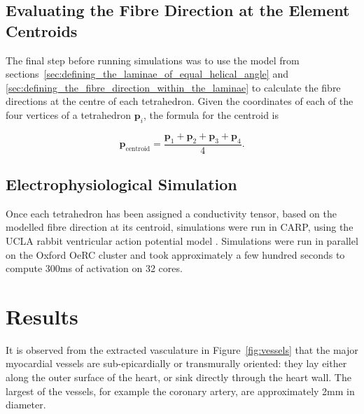 \subsection{Evaluating the Fibre Direction at the Element Centroids} %
\label{sec:evaluating_the_fibre_direction_at_the_element_centroids}
  The final step before running simulations was to use the model from sections~\ref{sec:defining_the_laminae_of_equal_helical_angle} and \ref{sec:defining_the_fibre_direction_within_the_laminae} to calculate the fibre directions at the centre of each tetrahedron. Given the coordinates of each of the four vertices of a tetrahedron $\mathbf{p}_i$, the formula for the centroid is
  
  \begin{equation}
    \mathbf{p}_{\text{centroid}} = \frac{\mathbf{p}_1+\mathbf{p}_2+\mathbf{p}_3+\mathbf{p}_4}{4} .
  \end{equation}
  

\subsection{Electrophysiological Simulation} %
\label{sec:electrophysiological_simulation}  
  Once each tetrahedron has been assigned a conductivity tensor, based on the modelled fibre direction at its centroid, simulations were run in CARP, using the UCLA rabbit ventricular action potential model \cite{Mahajan2008}. Simulations were run in parallel on the Oxford OeRC cluster and took approximately a few hundred seconds to compute 300ms of activation on 32 cores.

\section{Results} %
\label{sec:results}
  
  It is observed from the extracted vasculature in Figure~\ref{fig:vessels} that the major myocardial vessels are sub-epicardially or transmurally oriented: they lay either along the outer surface of the heart, or sink directly through the heart wall. The largest of the vessels, for example the coronary artery, are approximately 2mm in diameter.
  
